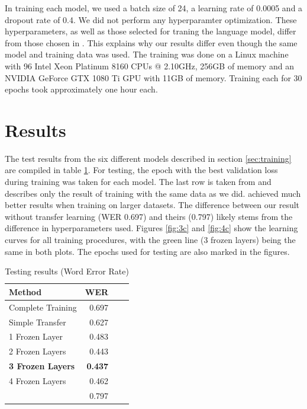 \documentclass[12pt]{article}    %
\begin{document}
In training each model, we used a batch size of 24, a learning rate of 0.0005 and a dropout rate of 0.4. We did not perform any hyperparamter optimization. These hyperparameters, as well as those selected for traning the language model, differ from those chosen in \parencite{agarwal-zesch-2019-german}. This explains why our results differ even though the same model and training data was used. The training was done on a Linux machine with 96 Intel Xeon Platinum 8160 CPUs @ 2.10GHz, 256GB of memory and an NVIDIA GeForce GTX 1080 Ti GPU with 11GB of memory. Training each for 30 epochs took approximately one hour each.

\section{Results}
The test results from the six different models described in section \ref{sec:training} are compiled in table \ref{tab:results}. For testing, the epoch with the best validation loss during training was taken for each model. The last row is taken from \parencite[Table 3]{agarwal-zesch-2019-german} and describes only the result of training with the same data as we did. \textcite{agarwal-zesch-2019-german} achieved much better results when training on larger datasets. The difference between our result without transfer learning (WER 0.697) and theirs (0.797) likely stems from the difference in hyperparameters used. Figures \ref{fig:3c} and \ref{fig:4c} show the learning curves for all training procedures, with the green line (3 frozen layers) being the same in both plots. The epochs used for testing are also marked in the figures.

\begin{table}[ht]
    \centering
    \vspace{5mm}
    \begin{tabular}{lrrr}
        \toprule
        Method & WER \\
        \midrule
        Complete Training & 0.697 \\
        Simple Transfer & 0.627 \\
        1 Frozen Layer & 0.483 \\
        2 Frozen Layers & 0.443 \\
        \textbf{3 Frozen Layers} & \textbf{0.437} \\
        4 Frozen Layers & 0.462 \\
        \cite{agarwal-zesch-2019-german} & 0.797 \\
        \bottomrule
    \end{tabular}
    \caption{Testing results (Word Error Rate)}
    \label{tab:results}
\end{table}
\end{document}
